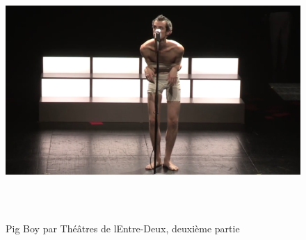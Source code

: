 \documentclass[
]{article}
\begin{document}
\begin{figure}
\centering
\includegraphics[width=17cm,height=9.767cm]{../assets/Pictures/10000201000004C6000002BEFCEC39B4E0EBE82E.png}
\caption{Pig Boy par Théâtres de l\textquotesingle Entre-Deux, deuxième partie}\label{fig:fig-1-3}
\end{figure}
\end{document}
